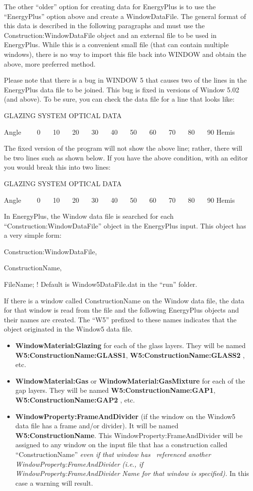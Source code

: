 The other ``older'' option for creating data for EnergyPlus is to use the ``EnergyPlus'' option above and create a WindowDataFile. The general format of this data is described in the following paragraphs and must use the Construction:WindowDataFile object and an external file to be used in EnergyPlus. While this is a convenient small file (that can contain multiple windows), there is no way to import this file back into WINDOW and obtain the above, more preferred method.

Please note that there is a bug in WINDOW 5 that causes two of the lines in the EnergyPlus data file to be joined. This bug is fixed in versions of Window 5.02 (and above). To be sure, you can check the data file for a line that looks like:

GLAZING SYSTEM OPTICAL DATA

Angle~~~~ 0~~~ 10~~~ 20~~~ 30~~~ 40~~~ 50~~~ 60~~~ 70~~~ 80~~~ 90 Hemis

The fixed version of the program will not show the above line; rather, there will be two lines such as shown below. If you have the above condition, with an editor you would break this into two lines:

GLAZING SYSTEM OPTICAL DATA

Angle~~~~ 0~~~ 10~~~ 20~~~ 30~~~ 40~~~ 50~~~ 60~~~ 70~~~ 80~~~ 90 Hemis

In EnergyPlus, the Window data file is searched for each ``Construction:WindowDataFile'' object in the EnergyPlus input. This object has a very simple form:

Construction:WindowDataFile,

ConstructionName,

FileName; ! Default is Window5DataFile.dat in the ``run'' folder.

If there is a window called ConstructionName on the Window data file, the data for that window is read from the file and the following EnergyPlus objects and their names are created. The ``W5'' prefixed to these names indicates that the object originated in the Window5 data file.

\begin{itemize}
\item
  \textbf{WindowMaterial:Glazing} for each of the glass layers. They will be named \textbf{W5:ConstructionName:GLASS1}, \textbf{W5:ConstructionName:GLASS2} , etc.
\item
  \textbf{WindowMaterial:Gas} or \textbf{WindowMaterial:GasMixture} for each of the gap layers. They will be named \textbf{W5:ConstructionName:GAP1}, \textbf{W5:ConstructionName:GAP2} , etc.
\item
  \textbf{WindowProperty:FrameAndDivider} (if the window on the Window5 data file has a frame and/or divider). It will be named \textbf{W5:ConstructionName}. This WindowProperty:FrameAndDivider will be assigned to any window on the input file that has a construction called ``ConstructionName'' \emph{even if that window has~ referenced another WindowProperty:FrameAndDivider (i.e., if WindowProperty:FrameAndDivider Name for that window is specified).} In this case a warning will result.
\end{itemize}

